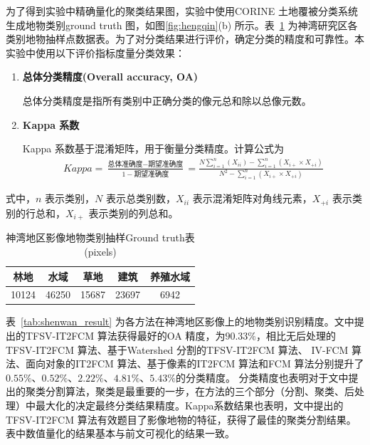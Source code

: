 为了得到实验中精确量化的聚类结果图，实验中使用CORINE 土地覆被分类系统生成地物类别ground truth 图，如图\ref{fig:hengqin}(b) 所示。表~\ref{tab:shenwan_data} 为神湾研究区各类别地物抽样点数据表。为了对分类结果进行评价，确定分类的精度和可靠性。本实验中使用以下评价指标度量分类效果：
\begin{enumerate}
    \item \textbf{总体分类精度(Overall accuracy, OA)}

          总体分类精度是指所有类别中正确分类的像元总和除以总像元数。
    \item \textbf{Kappa 系数}

          Kappa 系数基于混淆矩阵，用于衡量分类精度。计算公式为
          \begin{equation}\label{eq:kappa}
              \begin{split}
                  Kappa = \frac{\mbox{总体准确度}-\mbox{期望准确度}}{1-\mbox{期望准确度}} = \frac{N\sum_{i=1}^n(X_{ii}) - \sum_{i=1}^n(X_{i+} \times X_{+i})}{N^2 - \sum_{i=1}^n(X_{i+} \times X_{+i})}
              \end{split}
          \end{equation}
\end{enumerate}
式中，$n$ 表示类别，$N$ 表示总类别数，$X_{ii}$ 表示混淆矩阵对角线元素，$X_{+i}$ 表示类别的行总和，$X_{i+}$ 表示类别的列总和。


\begin{table}[htb]
    \caption{神湾地区影像地物类别抽样Ground truth表(pixels)}\label{tab:shenwan_data}
    \centering
    \begin{tabular}{ccccc}
        \toprule
        林地  & 水域  & 草地  & 建筑  & 养殖水域 \\
        \midrule
        10124 & 46250 & 15687 & 23697 & 6942     \\
        \bottomrule
    \end{tabular}
\end{table}


表~\ref{tab:shenwan_result} 为各方法在神湾地区影像上的地物类别识别精度。文中提出的TFSV-IT2FCM 算法获得最好的OA 精度，为$90.33\%$，相比无后处理的TFSV-IT2FCM 算法、基于Watershed 分割的TFSV-IT2FCM 算法、 IV-FCM 算法、面向对象的IT2FCM 算法、基于像素的IT2FCM 算法和FCM 算法分别提升了$0.55\%$、$0.52\%$、$2.22\%$、$4.81\%$、$5.43\%$的分类精度。
分类精度也表明对于文中提出的聚类分割算法，聚类是最重要的一步，在方法的三个部分（分割、聚类、后处理）中最大化的决定最终分类结果精度。Kappa系数结果也表明，文中提出的TFSV-IT2FCM 算法有效题目了影像地物的特征，获得了最佳的聚类分割结果。表中数值量化的结果基本与前文可视化的结果一致。

